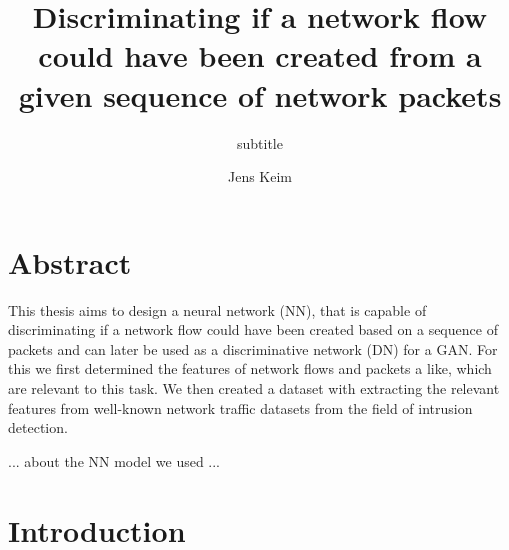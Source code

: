 \documentclass[
	ngerman,
	ruledheaders=section,%
	class=report,%
	thesis={type=bachelor},%
	accentcolor=9c,%
	custommargins=true,%
	marginpar=false,%
	parskip=half-,%
	fontsize=11pt,%
]{tudapub}
\begin{document}

\title{Discriminating if a network flow could have been created from a given sequence of network packets}
\subtitle{subtitle}
\author[J. Keim]{Jens Keim}%


\submissiondate{\today}
\examdate{\today}


\maketitle

\affidavit

\tableofcontents

\chapter{Abstract}

This thesis aims to design a neural network (NN), that is capable of discriminating if a network flow could have been created based on a sequence of packets and can later be used as a discriminative network (DN) for a GAN.
For this we first determined the features of network flows and packets a like, which are relevant to this task.
We then created a dataset with extracting the relevant features from well-known network traffic datasets from the field of intrusion detection.

... about the NN model we used ...


\chapter{Introduction}
\end{document}
